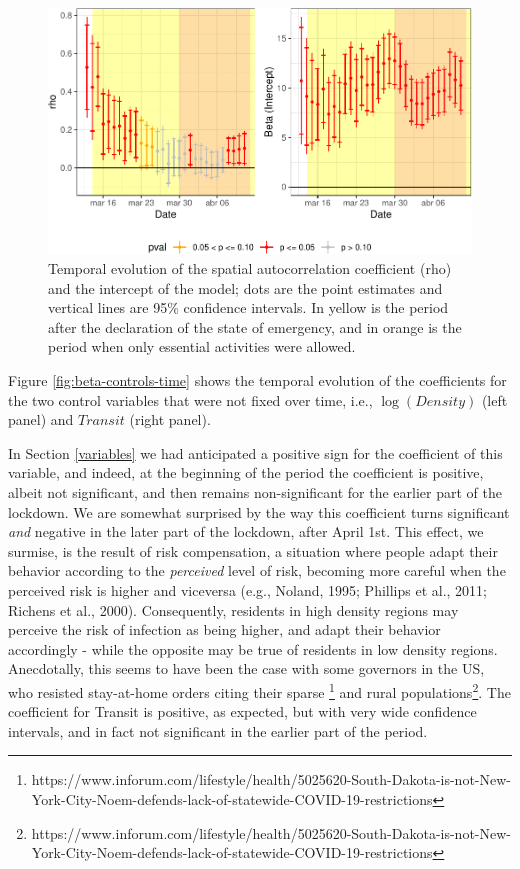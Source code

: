 \documentclass[]{elsarticle} %
\makeatletter
\def\maxwidth{\ifdim\Gin@nat@width>\linewidth\linewidth
\else\Gin@nat@width\fi}
\let\Oldincludegraphics\includegraphics
\renewcommand{\includegraphics}[1]{\Oldincludegraphics[width=\maxwidth]{#1}}
\makeatother
\begin{document}
\begin{figure}
\centering
\includegraphics{Environmental-Correlates-of-COVID19-Spain_files/figure-latex/results-time-1-1.pdf}
\caption{\label{fig:results-time-1}Temporal evolution of the spatial
autocorrelation coefficient (rho) and the intercept of the model; dots
are the point estimates and vertical lines are 95\% confidence
intervals. In yellow is the period after the declaration of the state of
emergency, and in orange is the period when only essential activities
were allowed.}
\end{figure}

Figure \ref{fig:beta-controls-time} shows the temporal evolution of the
coefficients for the two control variables that were not fixed over
time, i.e., \(\log(Density)\) (left panel) and \(Transit\) (right
panel).

In Section \ref{variables} we had anticipated a positive sign for the
coefficient of this variable, and indeed, at the beginning of the period
the coefficient is positive, albeit not significant, and then remains
non-significant for the earlier part of the lockdown. We are somewhat
surprised by the way this coefficient turns significant \emph{and}
negative in the later part of the lockdown, after April 1st. This
effect, we surmise, is the result of risk compensation, a situation
where people adapt their behavior according to the \emph{perceived}
level of risk, becoming more careful when the perceived risk is higher
and viceversa (e.g., Noland, 1995; Phillips et al., 2011; Richens et
al., 2000). Consequently, residents in high density regions may perceive
the risk of infection as being higher, and adapt their behavior
accordingly - while the opposite may be true of residents in low density
regions. Anecdotally, this seems to have been the case with some
governors in the US, who resisted stay-at-home orders citing their
sparse
\footnote{https://www.inforum.com/lifestyle/health/5025620-South-Dakota-is-not-New-York-City-Noem-defends-lack-of-statewide-COVID-19-restrictions}
and rural
populations\footnote{https://www.inforum.com/lifestyle/health/5025620-South-Dakota-is-not-New-York-City-Noem-defends-lack-of-statewide-COVID-19-restrictions}.
The coefficient for Transit is positive, as expected, but with very wide
confidence intervals, and in fact not significant in the earlier part of
the period.
\end{document}
